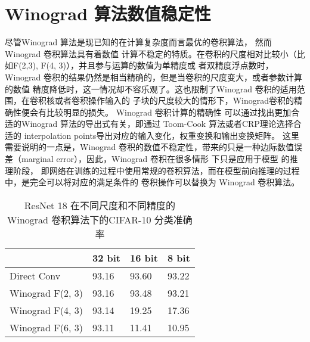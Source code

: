 \section{Winograd 算法数值稳定性}

尽管Winograd 算法是现已知的在计算复杂度而言最优的卷积算法， 然而 Winograd 卷积算法具有着数值
计算不稳定的特质。在卷积的尺度相对比较小（比如F(2,3), F(4, 3)），并且参与运算的数值为单精度或
者双精度浮点数时，Winograd 卷积的结果仍然是相当精确的，但是当卷积的尺度变大，或者参数计算的数值
精度降低时，这一情况却不容乐观了。这也限制了Winograd 卷积的适用范围，在卷积核或者卷积操作输入的
子块的尺度较大的情形下，Winograd卷积的精确性便会有比较明显的损失。 Winograd 卷积计算的精确性
可以通过找出更加合适的Winograd 算法的导出式有关，即通过 Toom-Cook 算法或者CRP理论选择合适的
interpolation points导出对应的输入变化，权重变换和输出变换矩阵。 这里需要说明的一点是，Winograd 
卷积的数值不稳定性，带来的只是一种边际数值误差（marginal error），因此，Winograd 卷积在很多情形
下只是应用于模型 的推理阶段，
即网络在训练的过程中使用常规的卷积算法，而在模型前向推理的过程中，是完全可以将对应的满足条件的
卷积操作可以替换为 Winograd 卷积算法。

\begin{table}[]
\label{tbl:winograd_acc}
\caption{ResNet 18 在不同尺度和不同精度的Winograd 卷积算法下的CIFAR-10 分类准确率}
\begin{tabular}{llll}
\hline
\multicolumn{1}{|l|}{}                 & \multicolumn{1}{l|}{32 bit} & \multicolumn{1}{l|}{16 bit} & \multicolumn{1}{l|}{8 bit} \\ \hline
\multicolumn{1}{|l|}{Direct  Conv}     & \multicolumn{1}{l|}{93.16}  & \multicolumn{1}{l|}{93.60}  & \multicolumn{1}{l|}{93.22} \\ \hline
\multicolumn{1}{|l|}{Winograd F(2, 3)} & \multicolumn{1}{l|}{93.16}  & \multicolumn{1}{l|}{93.48}  & \multicolumn{1}{l|}{93.21} \\ \hline
\multicolumn{1}{|l|}{Winograd F(4, 3)} & \multicolumn{1}{l|}{93.14}  & \multicolumn{1}{l|}{19.25}  & \multicolumn{1}{l|}{17.36} \\ \hline
Winograd F(6, 3)                       & 93.11                       & 11.41                       & 10.95                     
\end{tabular}
\end{table}

